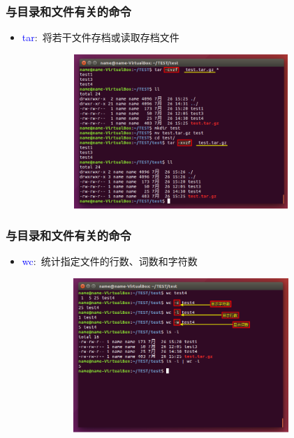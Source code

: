 \frame
{
	\frametitle{与目录和文件有关的命令}
	\begin{itemize}
		\item \textcolor{blue}{tar}:~将若干文件存档或读取存档文件
\begin{figure}[h!]
\centering
\vspace{-12.5pt}
\includegraphics[height=2.3in,width=3.9in,viewport=0 10 800 530,clip]{Figures/Ubuntu-tar.png}
\label{Linux-command-tar}
\end{figure}
	\end{itemize}
}

\frame
{
	\frametitle{与目录和文件有关的命令}
	\begin{itemize}
		\item \textcolor{blue}{wc}:~统计指定文件的行数、词数和字符数
\begin{figure}[h!]
\centering
\vspace{-12.5pt}
\includegraphics[height=2.3in,width=3.9in,viewport=0 60 800 560,clip]{Figures/Ubuntu-wc.png}
\label{Linux-command-wc}
\end{figure}
	\end{itemize}
}

